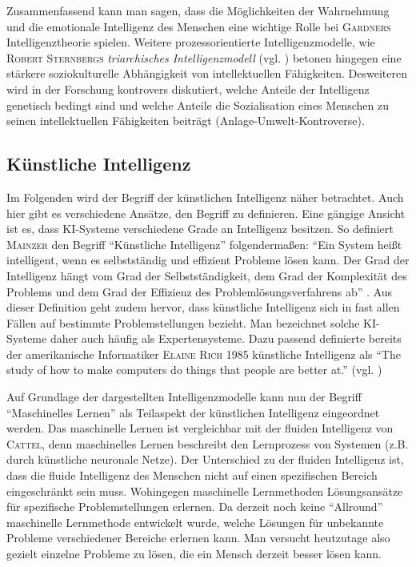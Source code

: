 \documentclass[a4paper, 11pt]{scrartcl}
\begin{document}
Zusammenfassend kann man sagen, dass die Möglichkeiten der Wahrnehmung und die emotionale Intelligenz des Menschen eine wichtige Rolle bei \textsc{Gardners} Intelligenztheorie spielen. Weitere prozessorientierte Intelligenzmodelle, wie \textsc{Robert Sternbergs} \textit{triarchisches Intelligenzmodell} (vgl. \cite{Stern1984}) betonen hingegen eine stärkere soziokulturelle Abhängigkeit von intellektuellen Fähigkeiten. Desweiteren wird in der Forschung kontrovers diskutiert, welche Anteile der Intelligenz genetisch bedingt sind und welche Anteile die Sozialisation eines Menschen zu seinen intellektuellen Fähigkeiten beiträgt (Anlage-Umwelt-Kontroverse).

\subsection{Künstliche Intelligenz}
Im Folgenden wird der Begriff der künstlichen Intelligenz näher betrachtet. Auch hier gibt es verschiedene Ansätze, den Begriff zu definieren. Eine gängige Ansicht ist es, dass KI-Systeme verschiedene Grade an Intelligenz besitzen. So definiert \textsc{Mainzer} den Begriff ``Künstliche Intelligenz'' folgendermaßen: ``Ein System heißt intelligent, wenn es selbstständig und effizient Probleme lösen kann. Der Grad der Intelligenz hängt vom Grad der Selbstständigkeit, dem Grad der Komplexität des Problems und dem Grad der Effizienz des Problemlösungsverfahrens ab'' \cite{Mainzer2003}. Aus dieser Definition geht zudem hervor, dass künstliche Intelligenz sich in fast allen Fällen auf bestimmte Problemstellungen bezieht. Man bezeichnet solche KI-Systeme daher auch häufig als Expertensysteme. Dazu passend definierte bereits der amerikanische Informatiker \textsc{Elaine Rich} 1985 künstliche Intelligenz als ``The study of how to make computers do things that people are better at.'' (vgl. \cite{Rich1985})

Auf Grundlage der dargestellten Intelligenzmodelle kann nun der Begriff ``Maschinelles Lernen'' als Teilaspekt der künstlichen Intelligenz eingeordnet werden. Das maschinelle Lernen ist vergleichbar mit der fluiden Intelligenz von \textsc{Cattel}, denn maschinelles Lernen beschreibt den Lernprozess von Systemen (z.B. durch künstliche neuronale Netze). Der Unterschied zu der fluiden Intelligenz ist, dass die fluide Intelligenz des Menschen nicht auf einen spezifischen Bereich eingeschränkt sein muss. Wohingegen maschinelle Lernmethoden  Lösungsansätze für spezifische Problemstellungen erlernen. Da derzeit noch keine ``Allround'' maschinelle Lernmethode entwickelt wurde, welche Lösungen für unbekannte Probleme verschiedener Bereiche erlernen kann. Man versucht heutzutage also gezielt einzelne Probleme zu lösen, die ein Mensch derzeit besser lösen kann.
\end{document}
